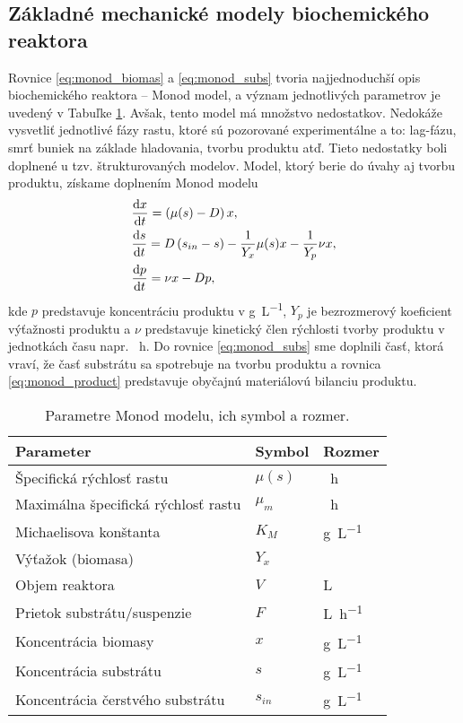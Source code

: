 \subsection{Základné mechanické modely biochemického reaktora}
Rovnice \eqref{eq:monod_biomas} a \eqref{eq:monod_subs} tvoria najjednoduchší opis biochemického reaktora -- Monod model, a význam jednotlivých parametrov je uvedený v Tabuľke \ref{tab:monod_params}. Avšak, tento model má množstvo nedostatkov. Nedokáže vysvetliť jednotlivé fázy rastu, ktoré sú pozorované experimentálne a to: lag-fázu, smrť buniek na základe hladovania, tvorbu produktu atď. Tieto nedostatky boli doplnené u tzv. štrukturovaných modelov. Model, ktorý berie do úvahy aj tvorbu produktu, získame doplnením Monod modelu
\begin{align} 
&\frac{\text{d}x}{\text{d}t} = \left(\mu(s) - D\right)x, \label{eq:chemostat_biomass}\\
&\frac{\text{d}s}{\text{d}t} = D\left(s_{in} - s\right) - \frac{1}{Y_{x}}\mu(s)x - \frac{1}{Y_{p}}\nu x, \label{eq:chemostat_substrate}\\
&\frac{\text{d}p}{\text{d}t} = \nu x - Dp, \label{eq:monod_product}
\end{align}
kde $p$ predstavuje koncentráciu produktu v \si{\gram\per\liter}, $Y_{p}$ je bezrozmerový koeficient výťažnosti produktu a $\nu$ predstavuje kinetický člen rýchlosti tvorby produktu v jednotkách času napr. \si{\per\hour}. Do rovnice \eqref{eq:monod_subs} sme doplnili časť, ktorá vraví, že časť substrátu sa spotrebuje na tvorbu produktu a rovnica \eqref{eq:monod_product} predstavuje obyčajnú materiálovú bilanciu produktu. 

\begin{table}
	\centering
	\caption{Parametre Monod modelu, ich symbol a rozmer.}
	\label{tab:monod_params}
	\begin{tabular}{lll}
		\hline
		\textbf{Parameter} & \textbf{Symbol} & \textbf{Rozmer} \\
		\hline
		Špecifická rýchlosť rastu & $\mu(s)$ & \si{\per\hour} \\
		Maximálna špecifická rýchlosť rastu & $\mu_{m}$ & \si{\per\hour} \\
		Michaelisova konštanta & $K_{M}$ & \si{\gram\per\liter} \\
		Výťažok (biomasa) & $Y_{x}$ & \\
		Objem reaktora & $V$ & \si{\liter} \\
		Prietok substrátu/suspenzie & $F$ & \si{\liter\per\hour} \\
		Koncentrácia biomasy & $x$ & \si{\gram\per\liter} \\
		Koncentrácia substrátu & $s$ & \si{\gram\per\liter} \\
		Koncentrácia čerstvého substrátu & $s_{in}$ & \si{\gram\per\liter} \\
		\hline
	\end{tabular}
\end{table}

